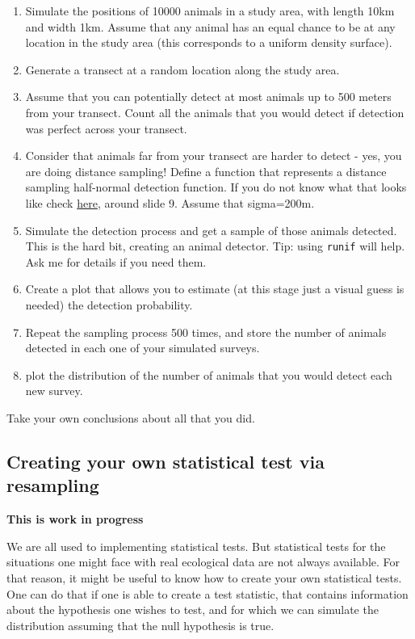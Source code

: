 \documentclass[
  letterpaper,
  DIV=11,
  numbers=noendperiod]{scrartcl}
\begin{document}
\begin{enumerate}
\def\labelenumi{\arabic{enumi}.}
\item
  Simulate the positions of 10000 animals in a study area, with length
  10km and width 1km. Assume that any animal has an equal chance to be
  at any location in the study area (this corresponds to a uniform
  density surface).
\item
  Generate a transect at a random location along the study area.
\item
  Assume that you can potentially detect at most animals up to 500
  meters from your transect. Count all the animals that you would detect
  if detection was perfect across your transect.
\item
  Consider that animals far from your transect are harder to detect -
  yes, you are doing distance sampling! Define a function that
  represents a distance sampling half-normal detection function. If you
  do not know what that looks like check
  \href{https://workshops.distancesampling.org/online-course/lecturepdfs/Ch1/L1-4\%20Choosing\%20a\%20Detection\%20Function.pdf}{here},
  around slide 9. Assume that sigma=200m.
\item
  Simulate the detection process and get a sample of those animals
  detected. This is the hard bit, creating an animal detector. Tip:
  using \texttt{runif} will help. Ask me for details if you need them.
\item
  Create a plot that allows you to estimate (at this stage just a visual
  guess is needed) the detection probability.
\item
  Repeat the sampling process 500 times, and store the number of animals
  detected in each one of your simulated surveys.
\item
  plot the distribution of the number of animals that you would detect
  each new survey.
\end{enumerate}

Take your own conclusions about all that you did.

\subsection{Creating your own statistical test via
resampling}\label{creating-your-own-statistical-test-via-resampling}

\textbf{This is work in progress}

We are all used to implementing statistical tests. But statistical tests
for the situations one might face with real ecological data are not
always available. For that reason, it might be useful to know how to
create your own statistical tests. One can do that if one is able to
create a test statistic, that contains information about the hypothesis
one wishes to test, and for which we can simulate the distribution
assuming that the null hypothesis is true.
\end{document}
